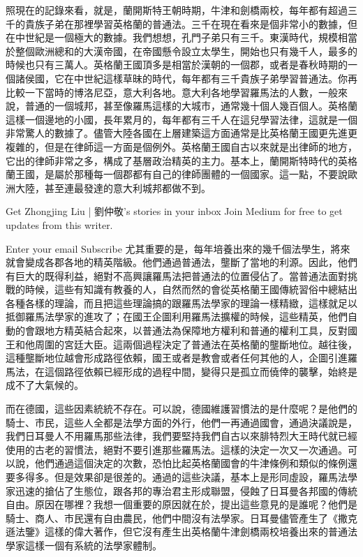 照現在的記錄來看，就是，蘭開斯特王朝時期，牛津和劍橋兩校，每年都有超過三千的貴族子弟在那裡學習英格蘭的普通法。三千在現在看來是個非常小的數據，但在中世紀是一個極大的數據。我們想想，孔門子弟只有三千。東漢時代，規模相當於整個歐洲總和的大漢帝國，在帝國懸令設立太學生，開始也只有幾千人，最多的時候也只有三萬人。英格蘭王國頂多是相當於漢朝的一個郡，或者是春秋時期的一個諸侯國，它在中世紀這樣草昧的時代，每年都有三千貴族子弟學習普通法。你再比較一下當時的博洛尼亞，意大利各地。意大利各地學習羅馬法的人數，一般來說，普通的一個城邦，甚至像羅馬這樣的大城市，通常幾十個人幾百個人。英格蘭這樣一個邊地的小國，長年累月的，每年都有三千人在這兒學習法律，這就是一個非常驚人的數據了。儘管大陸各國在上層建築這方面通常是比英格蘭王國更先進更複雜的，但是在律師這一方面是個例外。英格蘭王國自古以來就是出律師的地方，它出的律師非常之多，構成了基層政治精英的主力。基本上，蘭開斯特時代的英格蘭王國，是屬於那種每一個郡都有自己的律師團體的一個國家。這一點，不要說歐洲大陸，甚至連最發達的意大利城邦都做不到。

Get Zhongjing Liu | 劉仲敬’s stories in your inbox
Join Medium for free to get updates from this writer.

Enter your email
Subscribe
尤其重要的是，每年培養出來的幾千個法學生，將來就會變成各郡各地的精英階級。他們通過普通法，壟斷了當地的利源。因此，他們有巨大的既得利益，絕對不高興讓羅馬法把普通法的位置侵佔了。當普通法面對挑戰的時候，這些有知識有教養的人，自然而然的會從英格蘭王國傳統習俗中總結出各種各樣的理論，而且把這些理論搞的跟羅馬法學家的理論一樣精緻，這樣就足以抵御羅馬法學家的進攻了；在國王企圖利用羅馬法擴權的時候，這些精英，他們自動的會跟地方精英結合起來，以普通法為保障地方權利和普通的權利工具，反對國王和他周圍的宮廷大臣。這兩個過程決定了普通法在英格蘭的壟斷地位。越往後，這種壟斷地位越會形成路徑依賴，國王或者是教會或者任何其他的人，企圖引進羅馬法，在這個路徑依賴已經形成的過程中間，變得只是孤立而僥倖的襲擊，始終是成不了大氣候的。

而在德國，這些因素統統不存在。可以說，德國維護習慣法的是什麼呢？是他們的騎士、市民，這些人全都是法學方面的外行，他們一再通過國會，通過決議說是，我們日耳曼人不用羅馬那些法律，我們要堅持我們自古以來腓特烈大王時代就已經使用的古老的習慣法，絕對不要引進那些羅馬法。這樣的決定一次又一次通過。可以說，他們通過這個決定的次數，恐怕比起英格蘭國會的牛津條例和類似的條例還要多得多。但是效果卻是很差的。通過的這些決議，基本上是形同虛設，羅馬法學家迅速的搶佔了生態位，跟各邦的專治君主形成聯盟，侵蝕了日耳曼各邦國的傳統自由。原因在哪裡？我想一個重要的原因就在於，提出這些意見的是誰呢？他們是騎士、商人、市民還有自由農民，他們中間沒有法學家。日耳曼儘管產生了《撒克遜法鑒》這樣的偉大著作，但它沒有產生出英格蘭牛津劍橋兩校培養出來的普通法學家這樣一個有系統的法學家體制。

